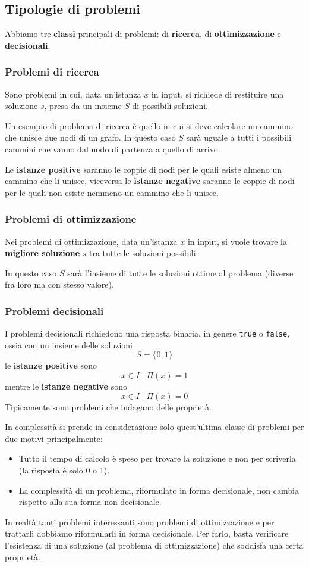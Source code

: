 \subsection{Tipologie di problemi}
Abbiamo tre \textbf{classi} principali di problemi: di \textbf{ricerca}, di \textbf{ottimizzazione} e
\textbf{decisionali}.

\subsubsection{Problemi di ricerca}
Sono problemi in cui, data un'istanza $x$ in input, si richiede di restituire una soluzione $s$, presa da un insieme
$S$ di possibili soluzioni.

Un esempio di problema di ricerca \`e quello in cui si deve calcolare un cammino che unisce due nodi di un grafo. In
questo caso $S$ sar\`a uguale a tutti i possibili cammini che vanno dal nodo di partenza a quello di arrivo.

Le \textbf{istanze positive} saranno le coppie di nodi per le quali esiste almeno un cammino che li unisce, viceversa
le \textbf{istanze negative} saranno le coppie di nodi per le quali non esiste nemmeno un cammino che li unisce.

\subsubsection{Problemi di ottimizzazione}
Nei problemi di ottimizzazione, data un'istanza $x$ in input, si vuole trovare la \textbf{migliore soluzione} $s$ tra
tutte le soluzioni possibili.

In questo caso $S$ sar\`a l'insieme di tutte le soluzioni ottime al problema (diverse fra loro ma con stesso valore).

\subsubsection{Problemi decisionali}
I problemi decisionali richiedono una risposta binaria, in genere \verb|true| o \verb|false|, ossia con un insieme delle
soluzioni
\[ S = \{ 0, 1 \} \]
le \textbf{istanze positive} sono
\[ x \in I \mid \Pi(x) = 1 \]
mentre le \textbf{istanze negative} sono
\[ x \in I \mid \Pi(x) = 0 \]
Tipicamente sono problemi che indagano delle propriet\`a.

In complessit\`a si prende in considerazione solo quest'ultima classe di problemi per due motivi principalmente:
\begin{itemize}
	\item Tutto il tempo di calcolo \`e speso per trovare la soluzione e non per scriverla (la risposta \`e solo 0 o 1).
	\item La complessit\`a di un problema, riformulato in forma decisionale, non cambia rispetto alla sua forma non
	      decisionale.
\end{itemize}
In realt\`a tanti problemi interessanti sono problemi di ottimizzazione e per trattarli dobbiamo riformularli in
forma decisionale. Per farlo, basta verificare l'esistenza di una soluzione (al problema di ottimizzazione) che
soddisfa una certa propriet\`a.


